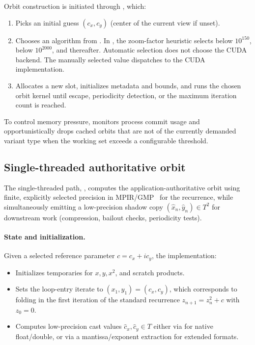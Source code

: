 Orbit construction is initiated through , which:

\begin{enumerate}
  \item Picks an initial guess \((c_x,c_y)\) (center of the current view
        if unset).
  \item Chooses an algorithm from .  In
        , the zoom-factor heuristic selects
         below $10^{150}$,
         below $10^{2000}$, and
         thereafter.  Automatic
        selection does not choose the CUDA backend.  The manually selected
         value dispatches to the CUDA implementation.
  \item Allocates a new  slot, initializes
        metadata and bounds, and runs the chosen orbit kernel until escape,
        periodicity detection, or the maximum iteration count is reached.
\end{enumerate}

To control memory pressure,  monitors process commit 
usage and opportunistically drops cached orbits that are not of the currently 
demanded variant type when the working set exceeds a configurable threshold.

\subsection{Single-threaded authoritative orbit}
\label{subsec:ref-orbit-st}

The single-threaded path,
,
computes the application-authoritative orbit using finite, explicitly selected
precision in
MPIR/GMP~\cite{MPIR_Library}  for the recurrence, while
simultaneously emitting a low-precision shadow copy
\((\hat{x}_n,\hat{y}_n)\in T^2\) for downstream work (compression,
bailout checks, periodicity tests).

\paragraph{State and initialization.}

Given a selected reference parameter \(c = c_x + i c_y\), the implementation:

\begin{itemize}
  \item Initializes  temporaries for \(x,y,x^2\), and scratch products.
  \item Sets the loop-entry iterate to \((x_1,y_1) = (c_x,c_y)\), which
        corresponds to folding in the first iteration of the standard
        recurrence \(z_{n+1}=z_n^2+c\) with \(z_0=0\).
  \item Computes low-precision cast values \(\hat{c}_x,\hat{c}_y \in T\) either via  for
        native float/double, or via a mantissa/exponent extraction for extended formats.
\end{itemize}

